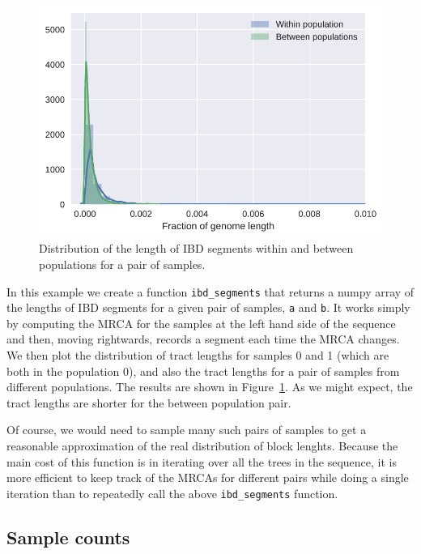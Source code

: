 \documentclass[graybox]{svmult}
\newcommand{\includenbimage}[1]{\begin{center}\texttt{[image: \#1]}\end{center}}
\begin{document}
\begin{figure}
\begin{center}
\includegraphics[width=\textwidth]{images/processing-results_5_0}
\end{center}
\caption{\label{fig:ibd_segments}Distribution of the length of IBD
segments within and between populations for a pair of samples.}
\end{figure}

In this example we create a function \texttt{ibd\_segments} that returns
a numpy array of the lengths of IBD segments for a given pair of
samples, \texttt{a} and \texttt{b}. It works simply by computing the
MRCA for the samples at the left hand side of the sequence and then,
moving rightwards, records a segment each time the MRCA changes. We then
plot the distribution of tract lengths for samples 0 and 1 (which are
both in the population 0), and also the tract lengths for a pair of
samples from different populations. The results are shown in
Figure~\ref{fig:ibd_segments}. As we might expect, the tract
lengths are shorter for the between population pair.

Of course, we would need to sample many such pairs of samples to get a
reasonable approximation of the real distribution of block lenghts.
Because the main cost of this function is in iterating over all the
trees in the sequence, it is more efficient to keep track of the MRCAs
for different pairs while doing a single iteration than to repeatedly
call the above \texttt{ibd\_segments} function.

\subsection{Sample counts}\label{sample-counts}
\end{document}
